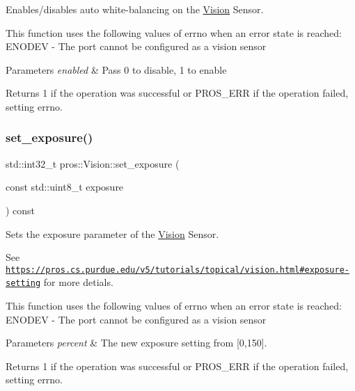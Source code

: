 Enables/disables auto white-\/balancing on the \hyperlink{classpros_1_1Vision}{Vision} Sensor. 

This function uses the following values of errno when an error state is reached\+: E\+N\+O\+D\+EV -\/ The port cannot be configured as a vision sensor


\begin{DoxyParams}{Parameters}
{\em enabled} & Pass 0 to disable, 1 to enable\\
\hline
\end{DoxyParams}
\begin{DoxyReturn}{Returns}
1 if the operation was successful or P\+R\+O\+S\+\_\+\+E\+RR if the operation failed, setting errno. 
\end{DoxyReturn}
\mbox{\label{classpros_1_1Vision_a2ad6faaad1abb936f52022022611ac7f}} 
\subsubsection{\texorpdfstring{set\+\_\+exposure()}{set\_exposure()}}
{\footnotesize\ttfamily std\+::int32\+\_\+t pros\+::\+Vision\+::set\+\_\+exposure (\begin{DoxyParamCaption}\item[{const std\+::uint8\+\_\+t}]{exposure }\end{DoxyParamCaption}) const}



Sets the exposure parameter of the \hyperlink{classpros_1_1Vision}{Vision} Sensor. 

See \href{https://pros.cs.purdue.edu/v5/tutorials/topical/vision.html#exposure-setting}{\tt https\+://pros.\+cs.\+purdue.\+edu/v5/tutorials/topical/vision.\+html\#exposure-\/setting} for more detials.

This function uses the following values of errno when an error state is reached\+: E\+N\+O\+D\+EV -\/ The port cannot be configured as a vision sensor


\begin{DoxyParams}{Parameters}
{\em percent} & The new exposure setting from \mbox{[}0,150\mbox{]}.\\
\hline
\end{DoxyParams}
\begin{DoxyReturn}{Returns}
1 if the operation was successful or P\+R\+O\+S\+\_\+\+E\+RR if the operation failed, setting errno. 
\end{DoxyReturn}
\mbox{\label{classpros_1_1Vision_ada3f1fdd2cc24c15af26bdd7c17bf604}} 
